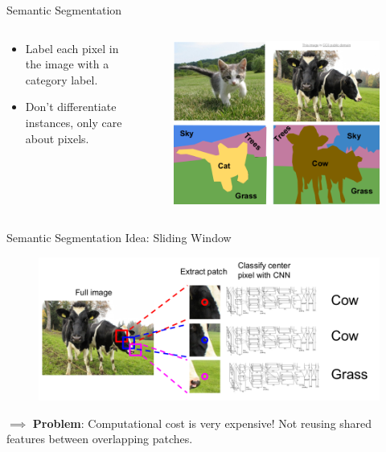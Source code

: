 \documentclass[aspectratio=169]{beamer}
\begin{document}
\begin{frame}{Semantic Segmentation}
\begin{columns}[T,c,onlytextwidth]
\begin{center}
\centering
\begin{itemize}
    \item Label each pixel in the image with a category label.
    \item Don't differentiate instances, only care about pixels.
\end{itemize}
\end{center}
\begin{figure}
    \centering
    \includegraphics[scale=0.3]{demo/figs/sematicseg.png}
\end{figure}
\end{columns}
\end{frame}

\begin{frame}{Semantic Segmentation Idea: Sliding Window}
\begin{figure}
    \centering
    \includegraphics[scale=0.35]{demo/figs/sw.png}
\end{figure}
$\implies$ \textbf{Problem}: Computational cost is very expensive! Not reusing shared features between overlapping patches.
\end{frame}
\end{document}
